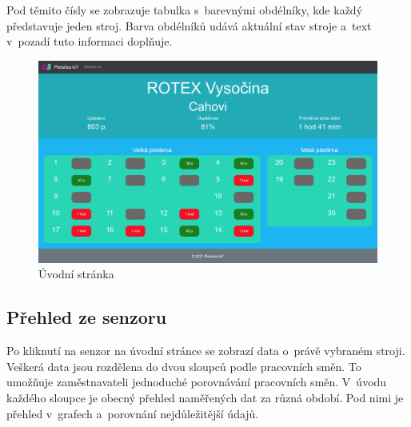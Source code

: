 Pod těmito čísly se zobrazuje tabulka s~barevnými obdélníky, kde každý představuje jeden stroj.
Barva obdélníků udává aktuální stav stroje a~text v~pozadí tuto informaci doplňuje. 

\begin{figure}[htbp]
    \centering
    \includegraphics[width=\textwidth]{img/Uvod.png}
    \caption{Úvodní stránka}
    \label{fig:webUvod}
\end{figure}

\subsection{Přehled ze senzoru} 
Po kliknutí na senzor na úvodní stránce se zobrazí data o~právě vybraném stroji.
Veškerá data jsou rozdělena do dvou sloupců podle pracovních směn.
To umožňuje zaměstnavateli jednoduché porovnávání pracovních směn.
V~úvodu každého sloupce je obecný přehled naměřených dat za různá období.
Pod nimi je přehled v~grafech a~porovnání nejdůležitější údajů.

